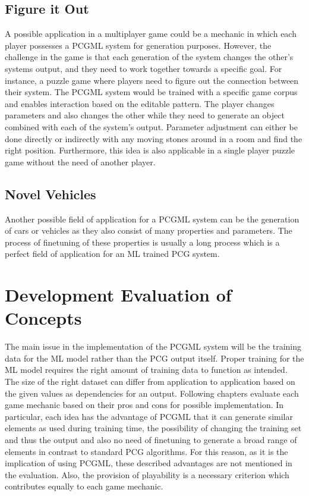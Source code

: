 \documentclass[MGS,Master,english]{twbook}%
\begin{document}
\subsection{Figure it Out} \label{idea::figureItOut}
A possible application in a multiplayer game could be a mechanic in which each player possesses a PCGML system for generation purposes. However, the challenge in the game is that each generation of the system changes the other’s systems output, and they need to work together towards a specific goal. For instance, a puzzle game where players need to figure out the connection between their system. The PCGML system would be trained with a specific game corpus and enables interaction based on the editable pattern. The player changes parameters and also changes the other while they need to generate an object combined with each of the system's output. Parameter adjustment can either be done directly or indirectly with any moving stones around in a room and find the right position. Furthermore, this idea is also applicable in a single player puzzle game without the need of another player.

\subsection{Novel Vehicles} \label{idea::novelCars}
Another possible field of application for a PCGML system can be the generation of cars or vehicles as they also consist of many properties and parameters. The process of finetuning of these properties is usually a long process which is a perfect field of application for an ML trained PCG system.

\section{Development Evaluation of Concepts}
The main issue in the implementation of the PCGML system will be the training data for the ML model rather than the PCG output itself. Proper training for the ML model requires the right amount of training data to function as intended. The size of the right dataset can differ from application to application based on the given values as dependencies for an output. Following chapters evaluate each game mechanic based on their pros and cons for possible implementation. In particular, each idea has the advantage of PCGML that it can generate similar elements as used during training time, the possibility of changing the training set and thus the output and also no need of finetuning to generate a broad range of elements in contrast to standard PCG algorithms. For this reason, as it is the implication of using PCGML, these described advantages are not mentioned in the evaluation. Also, the provision of playability is a necessary criterion which contributes equally to each game mechanic.
\end{document}
